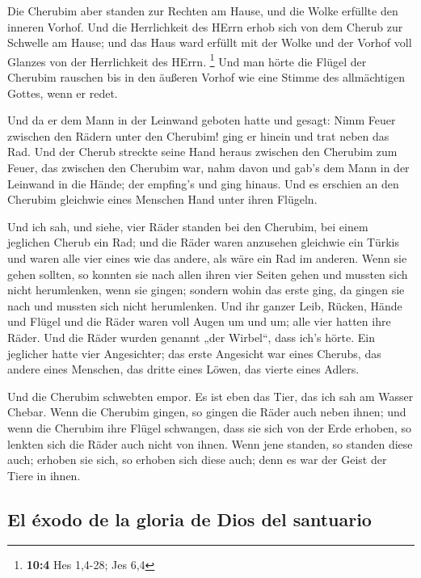 Die Cherubim aber standen zur Rechten am Hause, und die
Wolke erfüllte den inneren Vorhof.  Und die Herrlichkeit
des HErrn erhob sich von dem Cherub zur Schwelle am Hause; und das Haus
ward erfüllt mit der Wolke und der Vorhof voll Glanzes von der
Herrlichkeit des HErrn. \footnote{\textbf{10:4} Hes 1,4-28; Jes 6,4}
 Und man hörte die Flügel der Cherubim rauschen bis in den
äußeren Vorhof wie eine Stimme des allmächtigen Gottes, wenn er redet.

 Und da er dem Mann in der Leinwand geboten hatte und
gesagt: Nimm Feuer zwischen den Rädern unter den Cherubim! ging er
hinein und trat neben das Rad.  Und der Cherub streckte
seine Hand heraus zwischen den Cherubim zum Feuer, das zwischen den
Cherubim war, nahm davon und gab's dem Mann in der Leinwand in die
Hände; der empfing's und ging hinaus.  Und es erschien an
den Cherubim gleichwie eines Menschen Hand unter ihren Flügeln.

 Und ich sah, und siehe, vier Räder standen bei den
Cherubim, bei einem jeglichen Cherub ein Rad; und die Räder waren
anzusehen gleichwie ein Türkis  und waren alle vier eines
wie das andere, als wäre ein Rad im anderen.  Wenn sie
gehen sollten, so konnten sie nach allen ihren vier Seiten gehen und
mussten sich nicht herumlenken, wenn sie gingen; sondern wohin das erste
ging, da gingen sie nach und mussten sich nicht herumlenken.
 Und ihr ganzer Leib, Rücken, Hände und Flügel und die
Räder waren voll Augen um und um; alle vier hatten ihre Räder.
 Und die Räder wurden genannt „der Wirbel``, dass ich's
hörte.  Ein jeglicher hatte vier Angesichter; das erste
Angesicht war eines Cherubs, das andere eines Menschen, das dritte eines
Löwen, das vierte eines Adlers.

 Und die Cherubim schwebten empor. Es ist eben das Tier,
das ich sah am Wasser Chebar.  Wenn die Cherubim gingen,
so gingen die Räder auch neben ihnen; und wenn die Cherubim ihre Flügel
schwangen, dass sie sich von der Erde erhoben, so lenkten sich die Räder
auch nicht von ihnen.  Wenn jene standen, so standen
diese auch; erhoben sie sich, so erhoben sich diese auch; denn es war
der Geist der Tiere in ihnen.

\hypertarget{el-uxe9xodo-de-la-gloria-de-dios-del-santuario}{%
\subsection{El éxodo de la gloria de Dios del
santuario}\label{el-uxe9xodo-de-la-gloria-de-dios-del-santuario}}

